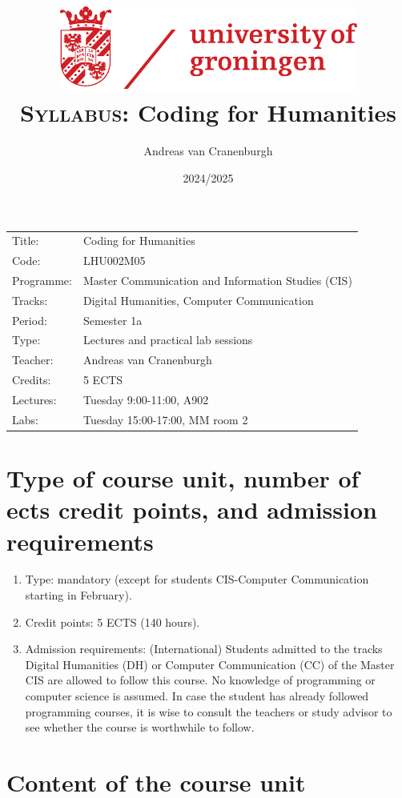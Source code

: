 \documentclass[a4paper,12pt]{article}
\title{
    \includegraphics{rug}\\
    \textsc{Syllabus:} Coding for Humanities}
\author{Andreas van Cranenburgh}
\date{2024/2025}
\begin{document}
\maketitle
\thispagestyle{empty}
\pagestyle{empty}


\begin{tabular}{l p{} }
    Title:      & Coding for Humanities \\
    Code:       & LHU002M05 \\
    Programme:  & Master Communication and Information Studies (CIS) \\
    Tracks:     & Digital Humanities, Computer Communication \\
    Period:     & Semester 1a \\
    Type:       & Lectures and practical lab sessions \\
    Teacher:    & Andreas van Cranenburgh \\
    Credits:    & 5 ECTS \\
    Lectures:   & Tuesday 9:00-11:00, A902 \\
    Labs:       & Tuesday 15:00-17:00, MM room 2 \\
\end{tabular}



\section{Type of course unit, number of ects credit points,
        and admission requirements}
\begin{enumerate}[label={(\alph*)}]
    \item Type: mandatory (except for students CIS-Computer Communication
        starting in February).
    \item Credit points: 5 ECTS (140 hours).
    \item Admission requirements: (International) Students admitted to the
        tracks Digital Humanities (DH) or Computer Communication (CC) of the
        Master CIS are allowed to follow this course. No knowledge of
        programming or computer science is assumed. In case the student has
        already followed programming courses, it is wise to consult the
        teachers or study advisor to see whether the course is worthwhile to
        follow.
\end{enumerate}

\section{Content of the course unit}
\end{document}
